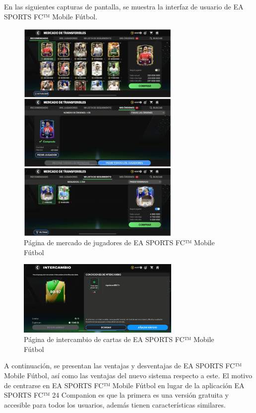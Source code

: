 En las siguientes capturas de pantalla, se muestra la interfaz de usuario de EA SPORTS FC™ Mobile Fútbol.
\begin{figure}[H]
    \centering
    \includegraphics[width=0.7\textwidth]{figures/4-Estudio-viabilidad/4_FC_Mercado.png}
    \caption{Página de mercado de jugadores de EA SPORTS FC™ Mobile Fútbol}
    \label{fig:ea_sports_fc_mobile}
    \hypertarget{fig:ea_sports_fc_mobile}{}
\end{figure}

\begin{figure}[H]
    \centering
    \includegraphics[width=0.7\textwidth]{figures/4-Estudio-viabilidad/4_FC-Intercambio.jpeg}
    \caption{Página de intercambio de cartas de EA SPORTS FC™ Mobile Fútbol}
    \label{fig:ea_sports_fc_mobile_2}
    \hypertarget{fig:ea_sports_fc_mobile_2}{}
\end{figure}

A continuación, se presentan las ventajas y desventajas de EA SPORTS FC™ Mobile Fútbol, así como las ventajas del nuevo sistema respecto a este. 
El motivo de centrarse en EA SPORTS FC™ Mobile Fútbol en lugar de la aplicación EA SPORTS FC™ 24 Companion es que la primera es una versión gratuita y accesible para todos los usuarios, además tienen características similares.

